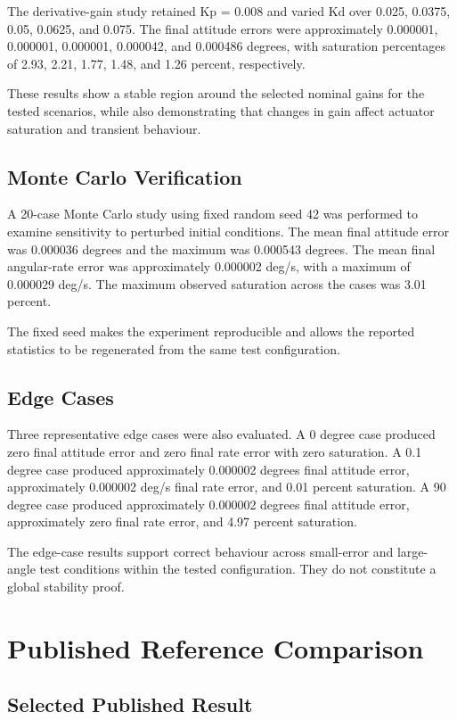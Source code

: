 \documentclass[11pt,a4paper]{article}
\begin{document}
The derivative-gain study retained Kp = 0.008 and varied Kd over 0.025, 0.0375, 0.05, 0.0625, and 0.075. The final attitude errors were approximately 0.000001, 0.000001, 0.000001, 0.000042, and 0.000486 degrees, with saturation percentages of 2.93, 2.21, 1.77, 1.48, and 1.26 percent, respectively.

These results show a stable region around the selected nominal gains for the tested scenarios, while also demonstrating that changes in gain affect actuator saturation and transient behaviour.

\subsection{Monte Carlo Verification}

A 20-case Monte Carlo study using fixed random seed 42 was performed to examine sensitivity to perturbed initial conditions. The mean final attitude error was 0.000036 degrees and the maximum was 0.000543 degrees. The mean final angular-rate error was approximately 0.000002 deg/s, with a maximum of 0.000029 deg/s. The maximum observed saturation across the cases was 3.01 percent.

The fixed seed makes the experiment reproducible and allows the reported statistics to be regenerated from the same test configuration.

\subsection{Edge Cases}

Three representative edge cases were also evaluated. A 0 degree case produced zero final attitude error and zero final rate error with zero saturation. A 0.1 degree case produced approximately 0.000002 degrees final attitude error, approximately 0.000002 deg/s final rate error, and 0.01 percent saturation. A 90 degree case produced approximately 0.000002 degrees final attitude error, approximately zero final rate error, and 4.97 percent saturation.

The edge-case results support correct behaviour across small-error and large-angle test conditions within the tested configuration. They do not constitute a global stability proof.


\section{Published Reference Comparison}

\subsection{Selected Published Result}
\end{document}
